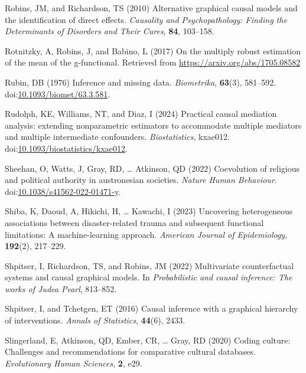 \documentclass[
  single column]{article}
\newlength{\cslhangindent}
\newenvironment{CSLReferences}[2] %
 {\begin{list}{}{%
  \setlength{\itemindent}{0pt}
  \setlength{\leftmargin}{0pt}
  \setlength{\parsep}{0pt}
  \ifodd #1
   \setlength{\leftmargin}{\cslhangindent}
   \setlength{\itemindent}{-1\cslhangindent}
  \fi
  \setlength{\itemsep}{#2\baselineskip}}}
 {\end{list}}
\begin{document}
\begin{CSLReferences}{1}{0}
Robins, JM, and Richardson, TS (2010) Alternative graphical causal
models and the identification of direct effects. \emph{Causality and
Psychopathology: Finding the Determinants of Disorders and Their Cures},
\textbf{84}, 103--158.

Rotnitzky, A, Robins, J, and Babino, L (2017) On the multiply robust
estimation of the mean of the g-functional. Retrieved from
\url{https://arxiv.org/abs/1705.08582}

Rubin, DB (1976) Inference and missing data. \emph{Biometrika},
\textbf{63}(3), 581--592.
doi:\href{https://doi.org/10.1093/biomet/63.3.581}{10.1093/biomet/63.3.581}.

Rudolph, KE, Williams, NT, and Diaz, I (2024) {Practical causal
mediation analysis: extending nonparametric estimators to accommodate
multiple mediators and multiple intermediate confounders}.
\emph{Biostatistics}, kxae012.
doi:\href{https://doi.org/10.1093/biostatistics/kxae012}{10.1093/biostatistics/kxae012}.

Sheehan, O, Watts, J, Gray, RD, \ldots{} Atkinson, QD (2022) Coevolution
of religious and political authority in austronesian societies.
\emph{Nature Human Behaviour}.
doi:\href{https://doi.org/10.1038/s41562-022-01471-y}{10.1038/s41562-022-01471-y}.

Shiba, K, Daoud, A, Hikichi, H, \ldots{} Kawachi, I (2023) Uncovering
heterogeneous associations between disaster-related trauma and
subsequent functional limitations: A machine-learning approach.
\emph{American Journal of Epidemiology}, \textbf{192}(2), 217--229.

Shpitser, I, Richardson, TS, and Robins, JM (2022) Multivariate
counterfactual systems and causal graphical models. In
\emph{Probabilistic and causal inference: The works of {J}udea {P}earl},
813--852.

Shpitser, I, and Tchetgen, ET (2016) Causal inference with a graphical
hierarchy of interventions. \emph{Annals of Statistics}, \textbf{44}(6),
2433.

Slingerland, E, Atkinson, QD, Ember, CR, \ldots{} Gray, RD (2020) Coding
culture: Challenges and recommendations for comparative cultural
databases. \emph{Evolutionary Human Sciences}, \textbf{2}, e29.


\end{CSLReferences}
\end{document}
